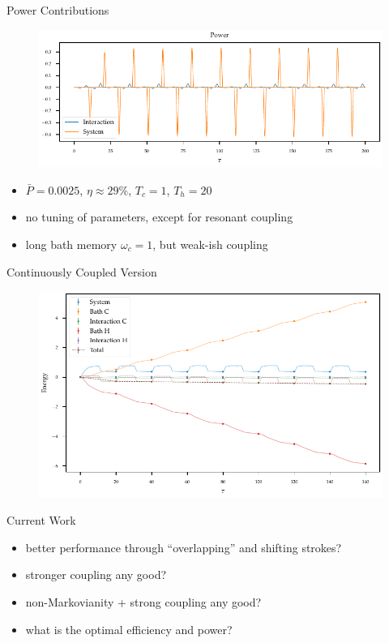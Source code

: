 \documentclass[10pt, aspectratio=169]{beamer}
\begin{document}
\begin{frame}{Power Contributions}
  \begin{figure}[h]
    \centering
    \includegraphics{figs/otto/power}
  \end{figure}
  \begin{itemize}
  \item \(\bar{P} = 0.0025\),
    \(η\approx 29\%\), \(T_{c}=1\), \(T_{h}=20\)
  \item no tuning of parameters, except for resonant coupling
  \item long bath memory \(ω_{c}=1\), but weak-ish coupling
  \end{itemize}
\end{frame}

\begin{frame}{Continuously Coupled Version}
  \begin{figure}
    \centering
    \includegraphics{figs/otto/energy_strobe_continuous}
  \end{figure}
\end{frame}
\begin{frame}{Current Work}
  \begin{itemize}
  \item better performance through ``overlapping'' and shifting strokes?
  \item stronger coupling any good?
  \item non-Markovianity + strong coupling any good?
  \item what is the optimal efficiency and power?
  \end{itemize}
\end{frame}
\end{document}

